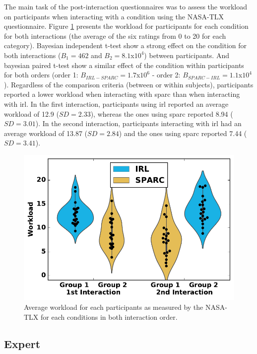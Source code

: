The main task of the post-interaction questionnaires was to assess the workload on participants when interacting with a condition using the NASA-TLX questionnaire. Figure \ref{fig:control_workload} presents the workload for participants for each condition for both interactions (the average of the six ratings from 0 to 20 for each category). Bayesian independent t-test show a strong effect on the condition for both interactions ($B_1=462$ and $B_2=8.1$x$10^4$) between participants. And bayesian paired t-test show a similar effect of the condition within participants for both orders (order 1: $B_{IRL-SPARC}=1.7$x$10^6$ - order 2: $B_{SPARC-IRL}=1.1$x$10^4$). Regardless of the comparison criteria (between or within subjects), participants reported a lower workload when interacting with \gls{sparc} than when interacting with \gls{irl}. In the first interaction, participants using \gls{irl} reported an average workload of 12.9 ($SD=2.33$), whereas the ones using \gls{sparc} reported 8.94 ($SD=3.01$). In the second interaction, participants interacting with \gls{irl} had an average workload of 13.87 ($SD=2.84$) and the ones using \gls{sparc} reported 7.44 ($SD=3.41$).

\begin{figure}[ht]
	\includegraphics[width=.5\textwidth]{workload.pdf}
	\centering
	\caption{Average workload for each participants as measured by the NASA-TLX for each conditions in both interaction order.
	}
	\label{fig:control_workload}
\end{figure}

\subsection{Expert} \label{ssec:control_expert}

